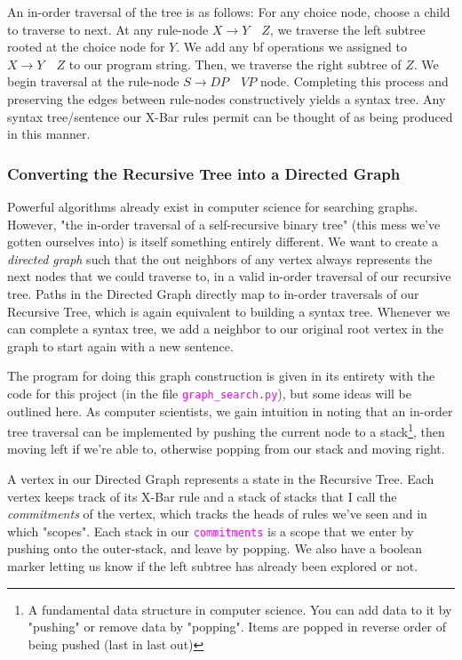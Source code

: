 \documentclass[runningheads]{llncs}
\newcommand{\code}[1]{\texttt{\textcolor{magenta}{\setlength{\fboxsep}{1pt}\colorbox{lightgray!20}{#1}}}}
\begin{document}
An in-order traversal of the tree is as follows: For any choice node, choose a child to traverse to next. At any rule-node $X \rightarrow Y \quad Z$, we traverse the left subtree rooted at the choice node for $Y$. We add any bf operations we assigned to $X \rightarrow Y \quad Z$ to our program string. Then, we traverse the right subtree of $Z$. We begin traversal at the rule-node $S \rightarrow DP \quad VP$ node. Completing this process and preserving the edges between rule-nodes constructively yields a syntax tree. Any syntax tree/sentence our X-Bar rules permit can be thought of as being produced in this manner.

\subsubsection{Converting the Recursive Tree into a Directed Graph}
Powerful algorithms already exist in computer science for searching graphs. However, "the in-order traversal of a self-recursive binary tree" (this mess we've gotten ourselves into) is itself something entirely different. We want to create a \textit{directed graph} such that the out neighbors of any vertex always represents the next nodes that we could traverse to, in a valid in-order traversal of our recursive tree. Paths in the Directed Graph directly map to in-order traversals of our Recursive Tree, which is again equivalent to building a syntax tree. Whenever we can complete a syntax tree,  we add a neighbor to our original root vertex in the graph to start again with a new sentence.

The program for doing this graph construction is given in its entirety with the code for this project (in the file \code{graph\_search.py}), but some ideas will be outlined here. As computer scientists, we gain intuition in noting that an in-order tree traversal can be implemented by pushing the current node to a stack\footnote{A fundamental data structure in computer science. You can add data to it by "pushing" or remove data by "popping". Items are popped in reverse order of being pushed (last in last out)}, then moving left if we're able to, otherwise popping from our stack and moving right.

A vertex in our Directed Graph represents a state in the Recursive Tree. Each vertex keeps track of its X-Bar rule and a stack of stacks that I call the \textit{commitments} of the vertex, which tracks the heads of rules we've seen and in which "scopes". Each stack in our \code{commitments} is a scope that we enter by pushing onto the outer-stack, and leave by popping. We also have a boolean marker letting us know if the left subtree has already been explored or not.
\end{document}
